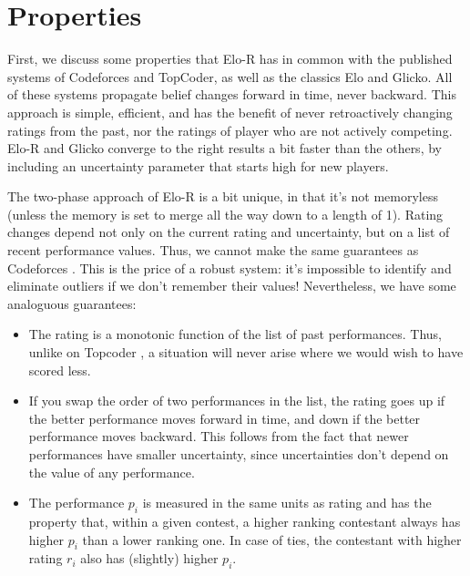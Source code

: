 
\section{Properties}

First, we discuss some properties that Elo-R has in common with the published systems of Codeforces and TopCoder, as well as the classics Elo and Glicko. All of these systems propagate belief changes forward in time, never backward. This approach is simple, efficient, and has the benefit of never retroactively changing ratings from the past, nor the ratings of player who are not actively competing. Elo-R and Glicko converge to the right results a bit faster than the others, by including an uncertainty parameter that starts high for new players.

The two-phase approach of Elo-R is a bit unique, in that it's not memoryless (unless the memory is set to merge all the way down to a length of 1). Rating changes depend not only on the current rating and uncertainty, but on a list of recent performance values. Thus, we cannot make the same guarantees as Codeforces \cite{Codeforces}. This is the price of a robust system: it's impossible to identify and eliminate outliers if we don't remember their values! Nevertheless, we have some analoguous guarantees:
\begin{itemize}
\item The rating is a monotonic function of the list of past performances. Thus, unlike on Topcoder \cite{forivsektheoretical}, a situation will never arise where we would wish to have scored less.
\item If you swap the order of two performances in the list, the rating goes up if the better performance moves forward in time, and down if the better performance moves backward. This follows from the fact that newer performances have smaller uncertainty, since uncertainties don't depend on the value of any performance.
\item The performance $p_i$ is measured in the same units as rating and has the property that, within a given contest, a higher ranking contestant always has higher $p_i$ than a lower ranking one. In case of ties, the contestant with higher rating $r_i$ also has (slightly) higher $p_i$.
\end{itemize}

